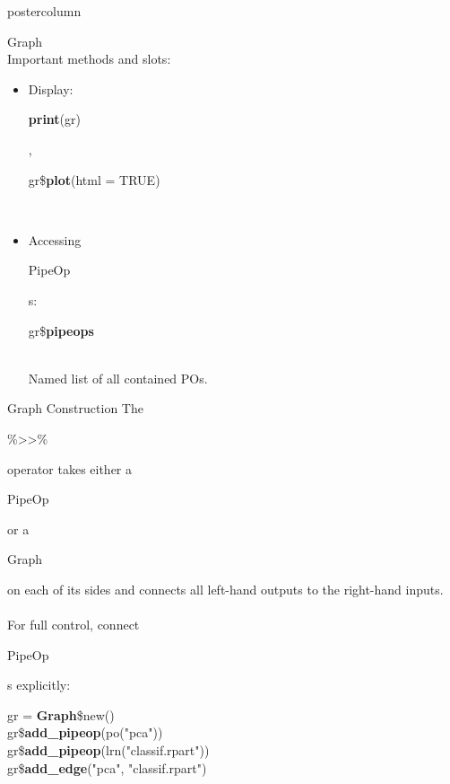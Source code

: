 \documentclass{beamer}
\newcommand{\codeinline}[1]{\begin{codeboxinline}#1\end{codeboxinline}}
\begin{document}
\begin{frame}[fragile]{}
\begin{columns}
\begin{column}{.245\textwidth}
\begin{beamercolorbox}[center]{postercolumn}
\begin{minipage}{.98\textwidth}
{\begin{myblock}{Graph}
              \ \\
              Important methods and slots:
              \begin{itemize}
                \item Display: \codeinline{\textbf{print}(gr)}, \codeinline{gr\$\textbf{plot}(html = TRUE)}\\
                \item Accessing \codeinline{PipeOp}s: \codeinline{gr\$\textbf{pipeops}}\\
                      Named list of all contained POs.
              \end{itemize}
            \end{myblock}
            \begin{myblock}{Graph Construction}
              The \codeinline{\%>{}>\%} operator takes either a \codeinline{PipeOp} or a \codeinline{Graph} on each of its sides and connects all left-hand outputs to the right-hand inputs.
              \ \\
              \\
              For full control, connect \codeinline{PipeOp}s explicitly:
              \begin{codeboxmultiline}[width=23cm]
                gr = \textbf{Graph}\$new()\\
                gr\$\textbf{add\_pipeop}(po("pca"))\\
                gr\$\textbf{add\_pipeop}(lrn("classif.rpart"))\\
                gr\$\textbf{add\_edge}("pca", "classif.rpart")

\end{codeboxmultiline}
\end{myblock}}
\end{minipage}
\end{beamercolorbox}
\end{column}
\end{columns}
\end{frame}
\end{document}

